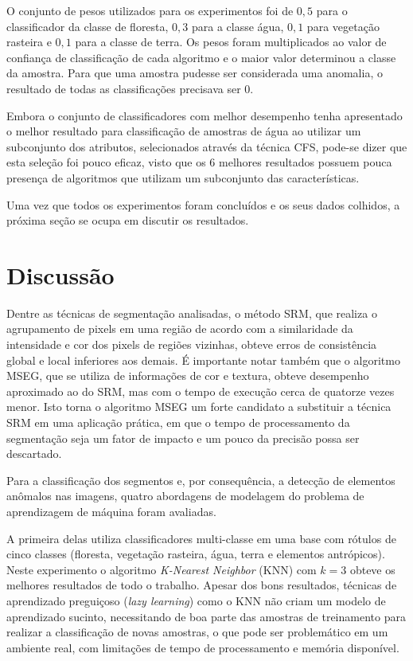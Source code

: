 O conjunto de pesos utilizados para os experimentos foi de $0,5$ para o classificador da classe de floresta, $0,3$ para a classe água, $0,1$ para vegetação rasteira e $0,1$ para a classe de terra. Os pesos foram multiplicados ao valor de confiança de classificação de cada algoritmo e o maior valor determinou a classe da amostra. Para que uma amostra pudesse ser considerada uma anomalia, o resultado de todas as classificações precisava ser $0$.

Embora o conjunto de classificadores com melhor desempenho tenha apresentado o melhor resultado para classificação de amostras de água ao utilizar um subconjunto dos atributos, selecionados através da técnica CFS, pode-se dizer que esta seleção foi pouco eficaz, visto que os 6 melhores resultados possuem pouca presença de algoritmos que utilizam um subconjunto das características.

Uma vez que todos os experimentos foram concluídos e os seus dados colhidos, a próxima seção se ocupa em discutir os resultados.

\section{Discussão}

Dentre as técnicas de segmentação analisadas, o método SRM, que realiza o agrupamento de pixels em uma região de acordo com a similaridade da intensidade e cor dos pixels de regiões vizinhas, obteve erros de consistência global e local inferiores aos demais. É importante notar também que o algoritmo MSEG, que se utiliza de informações de cor e textura, obteve desempenho aproximado ao do SRM, mas com o tempo de execução cerca de quatorze vezes menor. Isto torna o algoritmo MSEG um forte candidato a substituir a técnica SRM em uma aplicação prática, em que o tempo de processamento da segmentação seja um fator de impacto e um pouco da precisão possa ser descartado.

Para a classificação dos segmentos e, por consequência, a detecção de elementos anômalos nas imagens, quatro abordagens de modelagem do problema de aprendizagem de máquina foram avaliadas.

A primeira delas utiliza classificadores multi-classe em uma base com rótulos de cinco classes (floresta, vegetação rasteira, água, terra e elementos antrópicos). Neste experimento o algoritmo \textit{K-Nearest Neighbor} (KNN) com $k=3$ obteve os melhores resultados de todo o trabalho. Apesar dos bons resultados, técnicas de aprendizado preguiçoso (\textit{lazy learning}) como o KNN não criam um modelo de aprendizado sucinto, necessitando de boa parte das amostras de treinamento para realizar a classificação de novas amostras, o que pode ser problemático em um ambiente real, com limitações de tempo de processamento e memória disponível.

